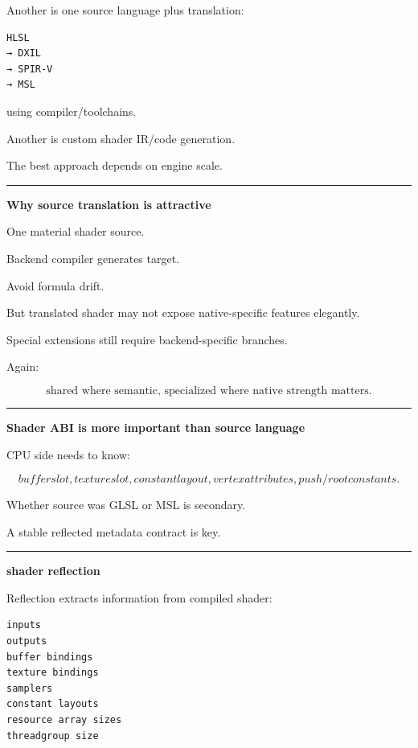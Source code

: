 Another is one source language plus translation:

\begin{verbatim}
HLSL
→ DXIL
→ SPIR-V
→ MSL
\end{verbatim}

using compiler/toolchains.

Another is custom shader IR/code generation.

The best approach depends on engine scale.

\begin{center}\rule{0.5\linewidth}{0.5pt}\end{center}

\textbf{Why source translation is attractive}

One material shader source.

Backend compiler generates target.

Avoid formula drift.

But translated shader may not expose native-specific features elegantly.

Special extensions still require backend-specific branches.

Again:

\[
\boxed{
\text{shared where semantic, specialized where native strength matters}.
}
\]

\begin{center}\rule{0.5\linewidth}{0.5pt}\end{center}

\textbf{Shader ABI is more important than source language}

CPU side needs to know:

\[
buffer slot,
texture slot,
constant layout,
vertex attributes,
push/root constants.
\]

Whether source was GLSL or MSL is secondary.

A stable reflected metadata contract is key.

\begin{center}\rule{0.5\linewidth}{0.5pt}\end{center}

\textbf{shader reflection}

Reflection extracts information from compiled shader:

\begin{verbatim}
inputs
outputs
buffer bindings
texture bindings
samplers
constant layouts
resource array sizes
threadgroup size
\end{verbatim}

